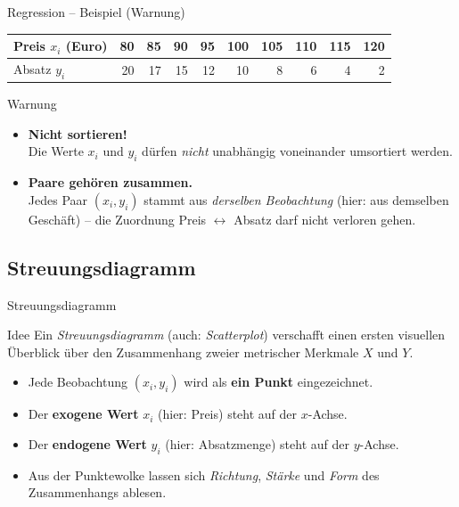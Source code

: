 \documentclass[aspectratio=169,11pt]{beamer}
\begin{document}
\begin{frame}{Regression -- Beispiel (Warnung)}
  \begin{center}
    \begin{tabular}{lrrrrrrrrr}
      \toprule
      Preis $x_i$ (Euro) & 80 & 85 & 90 & 95 & 100 & 105 & 110 & 115 & 120 \\
      \midrule
      Absatz $y_i$       & 20 & 17 & 15 & 12 & 10  & 8   & 6   & 4   & 2   \\
      \bottomrule
    \end{tabular}
  \end{center}

  \medskip

  \begin{alertblock}{Warnung}
    \begin{itemize}
      \item \textbf{Nicht sortieren!}\\
            Die Werte $x_i$ und $y_i$ dürfen \emph{nicht} unabhängig
            voneinander umsortiert werden.
      \item \textbf{Paare gehören zusammen.}\\
            Jedes Paar $(x_i, y_i)$ stammt aus \emph{derselben Beobachtung}
            (hier: aus demselben Geschäft) -- die Zuordnung
            Preis $\leftrightarrow$ Absatz darf nicht verloren gehen.
    \end{itemize}
  \end{alertblock}
\end{frame}

\subsection{Streuungsdiagramm}


\begin{frame}{Streuungsdiagramm}
  \begin{block}{Idee}
    Ein \emph{Streuungsdiagramm} (auch: \emph{Scatterplot}) verschafft
    einen ersten visuellen Überblick über den Zusammenhang zweier
    metrischer Merkmale $X$ und $Y$.
  \end{block}

  \medskip

  \begin{itemize}
    \item Jede Beobachtung $(x_i, y_i)$ wird als \textbf{ein Punkt}
          eingezeichnet.
    \item Der \textbf{exogene Wert} $x_i$ (hier: Preis) steht auf der
          $x$-Achse.
    \item Der \textbf{endogene Wert} $y_i$ (hier: Absatzmenge) steht auf
          der $y$-Achse.
    \item Aus der Punktewolke lassen sich \emph{Richtung}, \emph{Stärke}
          und \emph{Form} des Zusammenhangs ablesen.
  \end{itemize}
\end{frame}
\end{document}
